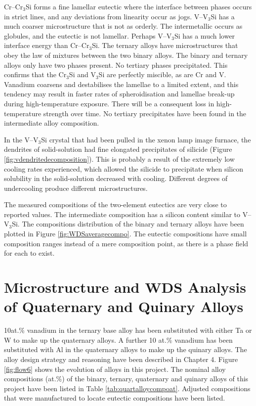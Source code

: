 Cr--Cr$_3$Si forms a fine lamellar eutectic where the interface between phases occurs in strict lines, and any deviations from linearity occur as jogs.  V--V$_3$Si has a much coarser microstructure that is not as orderly.  The intermetallic occurs as globules, and the eutectic is not lamellar.  Perhaps V--V$_3$Si has a much lower interface energy than Cr--Cr$_3$Si.  The ternary alloys have microstructures that obey the law of mixtures between the two binary alloys.
The binary and ternary alloys only have two phases present.  No tertiary phases precipitated.  This confirms that the Cr$_3$Si and V$_3$Si are perfectly miscible, as are Cr and V.  Vanadium coarsens and destabilises the lamellae to a limited extent, and this tendency may result in faster rates of spheroidisation and lamellae break-up during high-temperature exposure.  There will be a consequent loss in high-temperature strength over time.  No tertiary precipitates have been found in the intermediate alloy composition.

In the V--V$_3$Si crystal that had been pulled in the xenon lamp image furnace, the dendrites of solid-solution had fine elongated precipitates of silicide (Figure \ref{fig:vdendritedecomposition}).  This is probably a result of the extremely low cooling rates experienced, which allowed the silicide to precipitate when silicon solubility in the solid-solution decreased with cooling.  Different degrees of undercooling produce different microstructures.

The measured compositions of the two-element eutectics are very close to reported values.  The intermediate composition has a silicon content similar to V--V$_3$Si.  The compositions distribution of the binary and ternary alloys have been plotted in Figure \ref{fig:WDSaveragecompo}.  The eutectic compositions have small composition ranges instead of a mere composition point, as there is a phase field for each to exist.
  
\section{Microstructure and WDS Analysis of Quaternary and Quinary Alloys}

10at.\% vanadium in the ternary base alloy  has been substituted with either Ta or W to make up the quaternary alloys.  A further 10 at.\% vanadium has been substituted with Al in the quaternary alloys to make up the quinary alloys.  The alloy design strategy and reasoning have been described in Chapter 4.  Figure \ref{fig:flow6} shows the evolution of alloys in this project.  The nominal alloy compositions (at.\%) of the binary, ternary, quaternary and quinary alloys of this project have been listed in Table \ref{tab:quartalloycompoat}.  Adjusted compositions that were manufactured to locate eutectic compositions have been listed.
 
